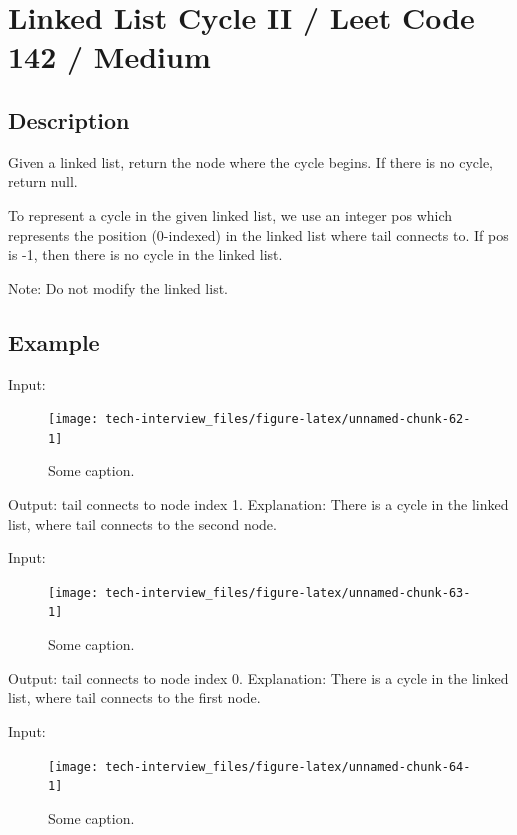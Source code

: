 \documentclass[]{book}
\begin{document}
\hypertarget{linked-list-cycle-ii-leet-code-142-medium}{%
\section{Linked List Cycle II / Leet Code 142 / Medium}\label{linked-list-cycle-ii-leet-code-142-medium}}

\hypertarget{description-91}{%
\subsection{Description}\label{description-91}}

Given a linked list, return the node where the cycle begins. If there is no cycle, return null.

To represent a cycle in the given linked list, we use an integer pos which represents the position
(0-indexed) in the linked list where tail connects to. If pos is -1, then there is no cycle in the linked
list.

Note: Do not modify the linked list.

\hypertarget{example-87}{%
\subsection{Example}\label{example-87}}

Input:

\begin{figure}
\texttt{[image: tech-interview\_files/figure-latex/unnamed-chunk-62-1]} \caption{Some caption.}\label{fig:unnamed-chunk-62}
\end{figure}

Output: tail connects to node index 1. Explanation: There is a cycle in the linked list, where tail
connects to the second node.

Input:

\begin{figure}
\texttt{[image: tech-interview\_files/figure-latex/unnamed-chunk-63-1]} \caption{Some caption.}\label{fig:unnamed-chunk-63}
\end{figure}

Output: tail connects to node index 0. Explanation: There is a cycle in the linked list, where tail
connects to the first node.

Input:

\begin{figure}
\texttt{[image: tech-interview\_files/figure-latex/unnamed-chunk-64-1]} \caption{Some caption.}\label{fig:unnamed-chunk-64}
\end{figure}
\end{document}

